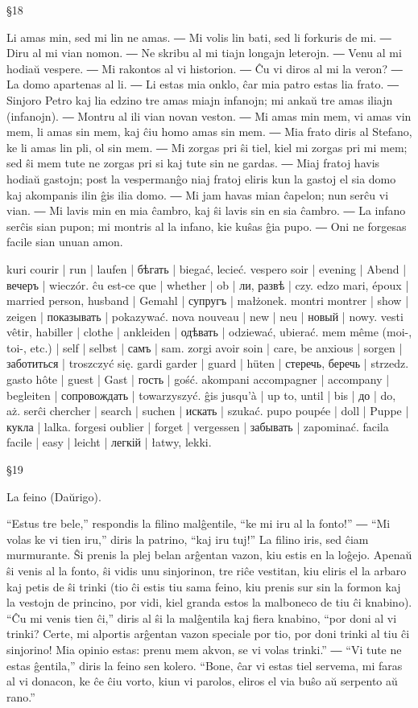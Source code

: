 §18

Li amas min, sed mi lin ne amas. ― Mi volis lin bati, sed li forkuris de mi. ― Diru al mi vian nomon. ― Ne skribu al mi tiajn longajn leterojn. ― Venu al mi hodiaŭ vespere. ― Mi rakontos al vi historion. ― Ĉu vi diros al mi la veron? ― La domo apartenas al li. ― Li estas mia onklo, ĉar mia patro estas lia frato. ― Sinjoro Petro kaj lia edzino tre amas miajn infanojn; mi ankaŭ tre amas iliajn (infanojn). ― Montru al ili vian novan veston. ― Mi amas min mem, vi amas vin mem, li amas sin mem, kaj ĉiu homo amas sin mem. ― Mia frato diris al Stefano, ke li amas lin pli, ol sin mem. ― Mi zorgas pri ŝi tiel, kiel mi zorgas pri mi mem; sed ŝi mem tute ne zorgas pri si kaj tute sin ne gardas. ― Miaj fratoj havis hodiaŭ gastojn; post la vespermanĝo niaj fratoj eliris kun la gastoj el sia domo kaj akompanis ilin ĝis ilia domo. ― Mi jam havas mian ĉapelon; nun serĉu vi vian. ― Mi lavis min en mia ĉambro, kaj ŝi lavis sin en sia ĉambro. ― La infano serĉis sian pupon; mi montris al la infano, kie kuŝas ĝia pupo. ― Oni ne forgesas facile sian unuan amon.

kuri courir | run | laufen | бѣгать | biegać, lecieć.
vespero soir | evening | Abend | вечеръ | wieczór.
ĉu est-ce que | whether | ob | ли, развѣ | czy.
edzo mari, époux | married person, husband | Gemahl | супругъ | małżonek.
montri montrer | show | zeigen | показывать | pokazywać.
nova nouveau | new | neu | новый | nowy.
vesti vêtir, habiller | clothe | ankleiden | одѣвать | odziewać, ubierać.
mem même (moi-, toi-, etc.) | self | selbst | самъ | sam.
zorgi avoir soin | care, be anxious | sorgen | заботиться | troszczyć się.
gardi garder | guard | hüten | стеречь, беречь | strzedz.
gasto hôte | guest | Gast | гость | gość.
akompani accompagner | accompany | begleiten | сопровождать | towarzyszyć.
ĝis jusqu’à | up to, until | bis | до | do, aż.
serĉi chercher | search | suchen | искать | szukać.
pupo poupée | doll | Puppe | кукла | lalka.
forgesi oublier | forget | vergessen | забывать | zapominać.
facila facile | easy | leicht | легкій | łatwy, lekki.

§19

La feino (Daŭrigo).

“Estus tre bele,” respondis la filino malĝentile, “ke mi iru al la fonto!” ― “Mi volas ke vi tien iru,” diris la patrino, “kaj iru tuj!” La filino iris, sed ĉiam murmurante. Ŝi prenis la plej belan arĝentan vazon, kiu estis en la loĝejo. Apenaŭ ŝi venis al la fonto, ŝi vidis unu sinjorinon, tre riĉe vestitan, kiu eliris el la arbaro kaj petis de ŝi trinki (tio ĉi estis tiu sama feino, kiu prenis sur sin la formon kaj la vestojn de princino, por vidi, kiel granda estos la malboneco de tiu ĉi knabino). “Ĉu mi venis tien ĉi,” diris al ŝi la malĝentila kaj fiera knabino, “por doni al vi trinki? Certe, mi alportis arĝentan vazon speciale por tio, por doni trinki al tiu ĉi sinjorino! Mia opinio estas: prenu mem akvon, se vi volas trinki.” ― “Vi tute ne estas ĝentila,” diris la feino sen kolero. “Bone, ĉar vi estas tiel servema, mi faras al vi donacon, ke ĉe ĉiu vorto, kiun vi parolos, eliros el via buŝo aŭ serpento aŭ rano.”

